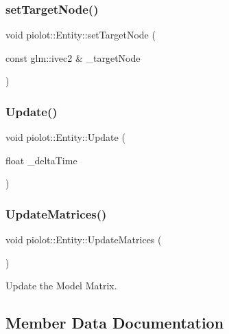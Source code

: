 \subsubsection{\texorpdfstring{set\+Target\+Node()}{setTargetNode()}}
{\footnotesize\ttfamily void piolot\+::\+Entity\+::set\+Target\+Node (\begin{DoxyParamCaption}\item[{const glm\+::ivec2 \&}]{\+\_\+target\+Node }\end{DoxyParamCaption})\hspace{0.3cm}{\ttfamily [inline]}}

\mbox{\label{classpiolot_1_1_entity_a35aed98e4aedd0aa64ee512f83d912ec}} 
\subsubsection{\texorpdfstring{Update()}{Update()}}
{\footnotesize\ttfamily void piolot\+::\+Entity\+::\+Update (\begin{DoxyParamCaption}\item[{float}]{\+\_\+delta\+Time }\end{DoxyParamCaption})}

\mbox{\label{classpiolot_1_1_entity_a100b4699f74f506217c4d545f5a81f58}} 
\subsubsection{\texorpdfstring{Update\+Matrices()}{UpdateMatrices()}}
{\footnotesize\ttfamily void piolot\+::\+Entity\+::\+Update\+Matrices (\begin{DoxyParamCaption}{ }\end{DoxyParamCaption})\hspace{0.3cm}{\ttfamily [protected]}}



Update the Model Matrix. 



\subsection{Member Data Documentation}
\mbox{\label{classpiolot_1_1_entity_a133cd55e173decca797dde8d6c4714d3}} 
